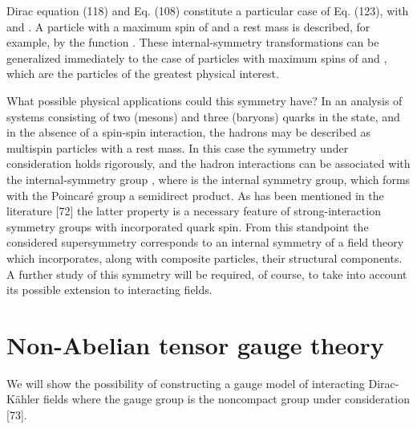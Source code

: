 \documentclass[a4paper,12pt]{article}
\begin{document}
Dirac equation (118) and Eq. (108) constitute a particular case of
Eq. (123), with \coordHE{} and \coordHE{}. A particle with a maximum spin of \coordHE{} and a
rest mass is described, for example, by the function \coordHE{}. These internal-symmetry transformations
can be generalized immediately to the case of particles with
maximum spins of \coordHE{} and \coordHE{}, which are the particles of the
greatest physical interest.

What possible physical applications could this symmetry have? In
an analysis of systems consisting of two (mesons) and three
(baryons) quarks in the \coordHE{} state, and in the absence of a
spin-spin interaction, the hadrons may be described as multispin
particles with a rest mass. In this case the symmetry under
consideration holds rigorously, and the hadron interactions can be
associated with the internal-symmetry group \coordHE{}, where \coordHE{} is the internal symmetry group, which
forms with the Poincar\'e group a semidirect product. As has been
mentioned in the literature [72] the latter property is a
necessary feature of strong-interaction symmetry groups with
incorporated quark spin. From this standpoint the considered
supersymmetry corresponds to an internal symmetry of a field
theory which incorporates, along with composite particles, their
structural components. A further study of this symmetry will be
required, of course, to take into account its possible extension
to interacting fields.

\section{Non-Abelian tensor gauge theory}

We will show the possibility of constructing a gauge model of
interacting Dirac-K\"ahler fields where the gauge group is the
noncompact group \coordHE{} under consideration [73].
\end{document}
